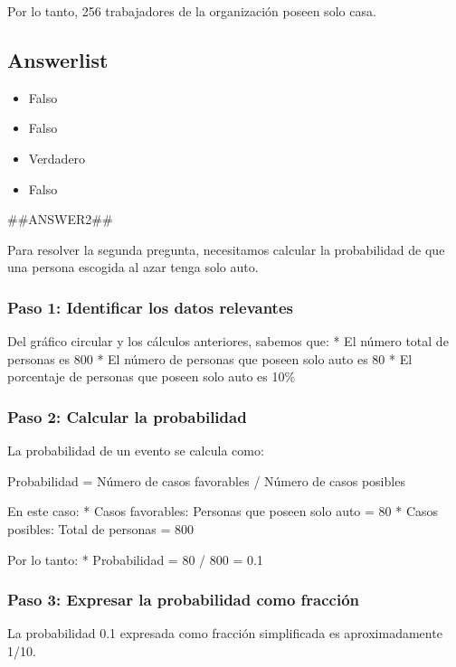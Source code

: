 \documentclass[
]{article}
\providecommand{\tightlist}{%
  \setlength{\itemsep}{0pt}\setlength{\parskip}{0pt}}
\begin{document}
Por lo tanto, 256 trabajadores de la organización poseen solo casa.

\subsection{Answerlist}\label{answerlist-2}

\begin{itemize}
\tightlist
\item
  Falso
\item
  Falso
\item
  Verdadero
\item
  Falso
\end{itemize}

\#\#ANSWER2\#\#

Para resolver la segunda pregunta, necesitamos calcular la probabilidad
de que una persona escogida al azar tenga solo auto.

\subsubsection{Paso 1: Identificar los datos
relevantes}\label{paso-1-identificar-los-datos-relevantes}

Del gráfico circular y los cálculos anteriores, sabemos que: * El número
total de personas es 800 * El número de personas que poseen solo auto es
80 * El porcentaje de personas que poseen solo auto es 10\%

\subsubsection{Paso 2: Calcular la
probabilidad}\label{paso-2-calcular-la-probabilidad}

La probabilidad de un evento se calcula como:

Probabilidad = Número de casos favorables / Número de casos posibles

En este caso: * Casos favorables: Personas que poseen solo auto = 80 *
Casos posibles: Total de personas = 800

Por lo tanto: * Probabilidad = 80 / 800 = 0.1

\subsubsection{Paso 3: Expresar la probabilidad como
fracción}\label{paso-3-expresar-la-probabilidad-como-fracciuxf3n}

La probabilidad 0.1 expresada como fracción simplificada es
aproximadamente 1/10.
\end{document}
